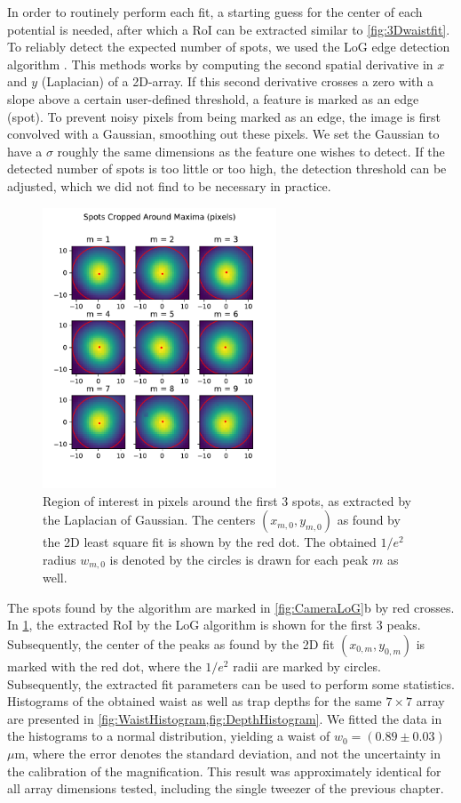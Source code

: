 In order to routinely perform each fit, a starting guess for the center of each potential is needed, after which a \ac{RoI} can be extracted similar to \cref{fig:3Dwaistfit}.
To reliably detect the expected number of spots, we used the \ac{LoG} edge detection algorithm \cite{Haralick1992}. 
This methods works by computing the second spatial derivative in $x$ and $y$ (Laplacian) of a 2D-array. 
If this second derivative crosses a zero with a slope above a certain user-defined threshold, a feature is marked as an edge (spot).
To prevent noisy pixels from being marked as an edge, the image is first convolved with a Gaussian, smoothing out these pixels. 
We set the Gaussian to have a $\sigma$ roughly the same dimensions as the feature one wishes to detect. 
If the detected number of spots is too little or too high, the detection threshold can be adjusted, which we did not find to be necessary in practice. 
\begin{figure}
    \centering
    \includegraphics[width=0.62\textwidth]{figures/SpotsCropped_range12.pdf}
    \caption{Region of interest in pixels around the first 3 spots, as extracted by the Laplacian of Gaussian. 
    The centers $(x_{m,0},y_{m,0})$ as found by the 2D least square fit is shown by the red dot. 
    The obtained $1/e^2$ radius $w_{m,0}$ is denoted by the circles is drawn for each peak $m$ as well.}
    \label{fig:SpotsRoI}
\end{figure}

The spots found by the algorithm are marked in \ref{fig:CameraLoG}b by red crosses. 
In \cref{fig:SpotsRoI}, the extracted \ac{RoI} by the \ac{LoG} algorithm is shown for the first 3 peaks. 
Subsequently, the center of the peaks as found by the 2D fit $(x_{0,m},y_{0,m})$ is marked with the red dot, where the $1/e^2$ radii are marked by circles. 
Subsequently, the extracted fit parameters can be used to perform some statistics.
Histograms of the obtained waist as well as trap depths for the same $7\times7$ array are presented in \cref{fig:WaistHistogram,fig:DepthHistogram}.
We fitted the data in the histograms to a normal distribution, yielding a waist of $w_0 = (0.89 \pm 0.03)$ $\mu$m, where the error denotes the standard deviation, and not the uncertainty in the calibration of the magnification. 
This result was approximately identical for all array dimensions tested, including the single tweezer of the previous chapter. 

